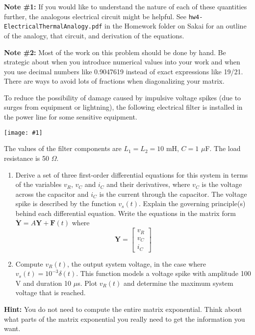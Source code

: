 \documentclass[12pt,letterpaper]{hmcpset}
\newcommand{\diagram}[2]{\begin{center}\texttt{[image: \#1]}\end{center}}
\begin{document}
	
	\begin{problem}[2 (cont.)]
		\setlength{\parskip}{3pt}
		\textbf{Note \#1:} If you would like to understand the nature of each of these quantities further, the
		analogous electrical circuit might be helpful. See \texttt{hw4-ElectricalThermalAnalogy.pdf} in
		the Homework folder on Sakai for an outline of the analogy, that circuit, and derivation of the
		equations.
		
		\textbf{Note \#2:} Most of the work on this problem should be done by hand. Be strategic about
		when you introduce numerical values into your work and when you use decimal numbers like 0.9047619 instead of exact expressions like 19/21. There are ways to avoid lots of fractions
		when diagonalizing your matrix.
	\end{problem}
	
	\begin{solution}
		\vfill
	\end{solution}
	
	\afterpage{\null\newpage}
	\newpage
	
	
	
	\begin{problem}[3]
		To reduce the possibility of damage caused by impulsive voltage spikes (due to surges from
		equipment or lightning), the following electrical filter is installed in the power line for some
		sensitive equipment.
		
		\diagram{Circuit}{3}
		
		The values of the filter components are $L_1 = L_2 = 10$ mH, $C = 1$ $\mu$F. The load resistance is 50 $\Omega$.
		\begin{enumerate}
			\item Derive a set of three first-order differential equations for this system in terms of the
			variables $v_R$, $v_C$ and $i_C$ and their derivatives, where $v_C$ is the voltage across the capacitor
			and $i_C$ is the current through the capacitor. The voltage spike is described by the
			function $v_s (t)$. Explain the governing principle(s) behind each differential equation.
			Write the equations in the matrix form $\Dot{\textbf{Y}} = A\textbf{Y} + \textbf{F}(t)$ where
			$$ \textbf{Y} = \begin{bmatrix}
			v_R\\
			v_C\\
			i_C
			\end{bmatrix} $$
			
			\item Compute $v_R (t)$, the output system voltage, in the case where $v_s (t) = 10^{-3} \delta(t)$. This
			function models a voltage spike with amplitude 100 V and duration 10 $\mu$s. Plot $v_R (t)$ and determine the maximum system voltage that is reached.
		\end{enumerate}
		
		\textbf{Hint:} You do not need to compute the entire matrix exponential. Think about what
		parts of the matrix exponential you really need to get the information you want.
	\end{problem}

	
	\begin{solution}
		\vfill
	\end{solution}
\end{document}
